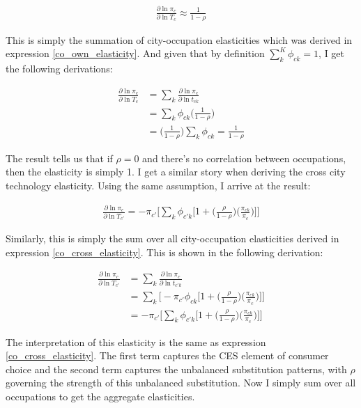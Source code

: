 \documentclass[10pt]{article}
\begin{document}
\begin{align*}
    \frac{\partial \ln \pi_c}{\partial \ln T_c} \approx \frac{1}{1 - \rho}
\end{align*}

This is simply the summation of city-occupation elasticities which was derived in expression \ref{co_own_elasticity}. And given that by definition $\sum \limits_k^K \phi_{ck} = 1$, I get the following derivations:

\begin{align*}
    \frac{\partial{\ln{\pi_{c}}}}{\partial\ln{T_{c}}} & = \sum\limits_{k}\frac{\partial{\ln{\pi_{c}}}}{\partial\ln{t_{ck}}} \\ &= \sum\limits_{k}\phi_{ck}\Bigg(\frac{1}{1-\rho}\Bigg) \\ &= \Bigg(\frac{1}{1-\rho}\Bigg)\sum\limits_{k}\phi_{ck} = \frac{1}{1-\rho}
\end{align*}

The result tells us that if $\rho = 0$ and there's no correlation between occupations, then the elasticity is simply 1. I get a similar story when deriving the cross city technology elasticity. Using the same assumption, I arrive at the result:

\begin{align}
    \frac{\partial\ln{\pi_{c}}}{\partial\ln{T_{c'}}} = -\pi_{c'}\Bigg[\sum\limits_{k}\phi_{{c'}k}\Big[1+\Big(\frac{\rho}{1-\rho}\Big)\Big(\frac{\pi_{ck}}{\pi_{c}}\Big)\Big]\Bigg]
    \label{city_cross_elasticity}
\end{align}

Similarly, this is simply the sum over all city-occupation elasticities derived in expression \ref{co_cross_elasticity}. This is shown in the following derivation:

\begin{align*}
    \frac{\partial\ln{\pi_{c}}}{\partial\ln{T_{c'}}} & = \sum\limits_{k}\frac{\partial\ln{\pi_{c}}}{\partial\ln{t_{{c'}k}}} \\ &= \sum\limits_{k}\Bigg[-{\pi_{c'}}{\phi_{ck}}\Big[1+\Big(\frac{\rho}{1-\rho}\Big)\Big(\frac{\pi_{ck}}{\pi_{c}}\Big)\Big]\Bigg]\\ &= -\pi_{c'}\Bigg[\sum\limits_{k}\phi_{{c'}k}\Big[1+\Big(\frac{\rho}{1-\rho}\Big)\Big(\frac{\pi_{ck}}{\pi_{c}}\Big)\Big]\Bigg]
\end{align*}

The interpretation of this elasticity is the same as expression \ref{co_cross_elasticity}. The first term captures the CES element of consumer choice and the second term captures the unbalanced substitution patterns, with $\rho$ governing the strength of this unbalanced substitution. Now I simply sum over all occupations to get the aggregate elasticities.
\end{document}
